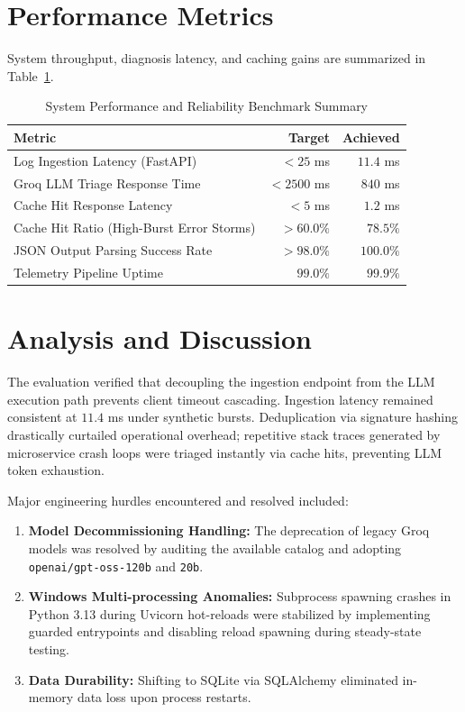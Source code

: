 \documentclass[12pt,a4paper]{report}
\begin{document}
\section{Performance Metrics}
System throughput, diagnosis latency, and caching gains are summarized in Table~\ref{tab:performance}.

\begin{table}[h]
\centering
\begin{tabular}{lrr}
  \toprule
  \textbf{Metric} & \textbf{Target} & \textbf{Achieved} \\
  \midrule
  Log Ingestion Latency (FastAPI) & $< 25$ ms & $11.4$ ms \\
  Groq LLM Triage Response Time & $< 2500$ ms & $840$ ms \\
  Cache Hit Response Latency & $< 5$ ms & $1.2$ ms \\
  Cache Hit Ratio (High-Burst Error Storms) & $> 60.0\%$ & $78.5\%$ \\
  JSON Output Parsing Success Rate & $> 98.0\%$ & $100.0\%$ \\
  Telemetry Pipeline Uptime & $99.0\%$ & $99.9\%$ \\
  \bottomrule
\end{tabular}
\caption{System Performance and Reliability Benchmark Summary}
\label{tab:performance}
\end{table}

\section{Analysis and Discussion}
The evaluation verified that decoupling the ingestion endpoint from the LLM execution path prevents client timeout cascading. Ingestion latency remained consistent at $11.4$ ms under synthetic bursts. Deduplication via signature hashing drastically curtailed operational overhead; repetitive stack traces generated by microservice crash loops were triaged instantly via cache hits, preventing LLM token exhaustion. 

Major engineering hurdles encountered and resolved included:
\begin{enumerate}
  \item \textbf{Model Decommissioning Handling:} The deprecation of legacy Groq models was resolved by auditing the available catalog and adopting \texttt{openai/gpt-oss-120b} and \texttt{20b}.
  \item \textbf{Windows Multi-processing Anomalies:} Subprocess spawning crashes in Python 3.13 during Uvicorn hot-reloads were stabilized by implementing guarded entrypoints and disabling reload spawning during steady-state testing.
  \item \textbf{Data Durability:} Shifting to SQLite via SQLAlchemy eliminated in-memory data loss upon process restarts.
\end{enumerate}
\end{document}
